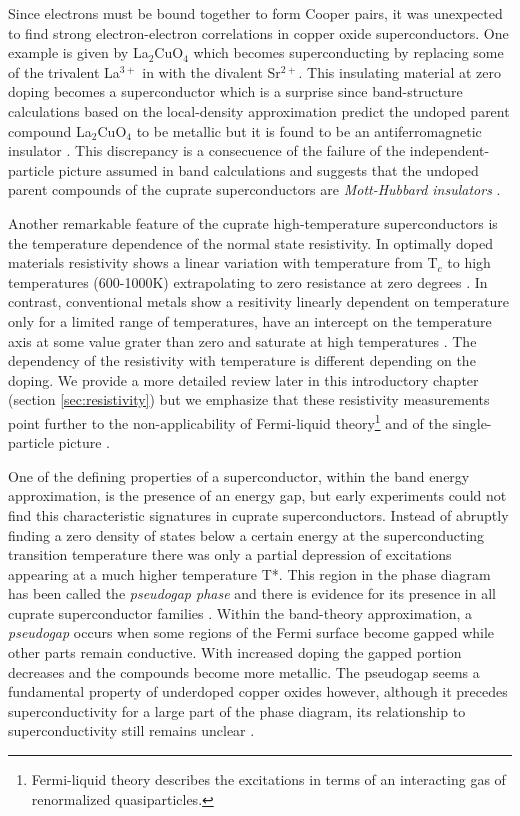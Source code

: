 Since electrons must be bound together to form Cooper pairs, it was unexpected to find strong electron-electron correlations in copper oxide superconductors. 
One example is given by La$_2$CuO$_4$ which becomes superconducting by replacing some of the trivalent La$^{3+}$ in with the divalent Sr$^{2+}$. 
This insulating material at zero doping becomes a superconductor which is a surprise since band-structure calculations based on the local-density approximation predict the undoped parent compound La$_2$CuO$_4$ to be metallic but it is found to be an antiferromagnetic insulator \cite{Timusk1999}.
This discrepancy is a consecuence of the failure of the independent-particle picture assumed in band calculations and suggests that the undoped parent compounds of the cuprate superconductors are \textit{Mott-Hubbard insulators} \cite{Mott1949}.

Another remarkable feature of the cuprate high-temperature superconductors is the temperature dependence of the normal state resistivity.
In optimally doped materials resistivity shows a linear variation with temperature from T$_c$ to high temperatures (600-1000K) extrapolating to zero resistance at zero degrees \cite{Gurvitch1987}.
In contrast, conventional metals show a resitivity linearly dependent on temperature only for a limited range of temperatures, have an intercept on the temperature axis at some value grater than zero and saturate at high temperatures \cite{Timusk1999}.
The dependency of the resistivity with temperature is different depending on the doping. 
We provide a more detailed review later in this introductory chapter (section \ref{sec:resistivity}) but we emphasize that these resistivity measurements point further to the non-applicability of Fermi-liquid theory\footnote{Fermi-liquid theory describes the excitations in terms of an interacting gas of renormalized quasiparticles.} and of the single-particle picture \cite{Orenstein2000}.

One of the defining properties of a superconductor, within the band energy approximation, is the presence of an energy gap, but early experiments could not find this characteristic signatures in cuprate superconductors.
Instead of abruptly finding a zero density of states below a certain energy at the superconducting transition temperature there was only a partial depression of excitations appearing at a much higher temperature T*.
This region in the phase diagram has been called the \textit{pseudogap phase} and there is evidence for its presence in all cuprate superconductor families \cite{Timusk1999,Muller2007}.
Within the band-theory approximation, a \textit{pseudogap} occurs when some regions of the Fermi surface become gapped while other parts remain conductive. 
With increased doping the gapped portion decreases and the compounds become more metallic. 
The pseudogap seems a fundamental property of underdoped copper oxides however, although it precedes superconductivity for a large part of the phase diagram, its relationship to superconductivity still remains unclear \cite{Basov2005}.


